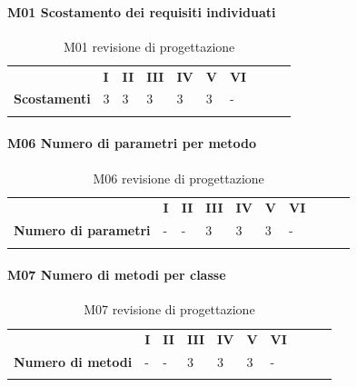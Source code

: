 \paragraph{M01 Scostamento dei requisiti individuati} \mbox{}
\begin{longtable}[H!] {						
		>{}p{50mm}  		
		>{}p{8mm}
		>{}p{8mm}		
		>{}p{8mm}		
		>{}p{8mm}		
		>{}p{8mm}		
		>{}p{8mm}
		>{}p{8mm}
		>{}p{8mm}
		>{}p{8mm}
	}
\rowcolor{gray!50}
\textbf{} & \textbf{I} & \textbf{II} & \textbf{III} & \textbf{IV} & \textbf{V} & \textbf{VI} \TBstrut \\ [2mm]
\textbf{Scostamenti} & 3 & 3 & 3 & 3 & 3 & - \TBstrut \\ [2mm]
	\rowcolor{white}
\caption{M01 revisione di progettazione}
\end{longtable}
\paragraph{M06 Numero di parametri per metodo} \mbox{}
\begin{longtable}[H!] {						
		>{}p{50mm}  		
		>{}p{8mm}
		>{}p{8mm}		
		>{}p{8mm}		
		>{}p{8mm}		
		>{}p{8mm}		
		>{}p{8mm}
		>{}p{8mm}
		>{}p{8mm}
		>{}p{8mm}
	}
	\rowcolor{gray!50}
	\textbf{} & \textbf{I} & \textbf{II} & \textbf{III} & \textbf{IV} & \textbf{V} & \textbf{VI} \TBstrut \\ [2mm]
	\textbf{Numero di parametri} & - & - & 3 & 3 & 3 & - \TBstrut \\ [2mm]
	\rowcolor{white}
	\caption{M06 revisione di progettazione}
\end{longtable}
\paragraph{M07 Numero di metodi per classe} \mbox{}
\begin{longtable}[H!] {						
		>{}p{50mm}  		
		>{}p{8mm}
		>{}p{8mm}		
		>{}p{8mm}		
		>{}p{8mm}		
		>{}p{8mm}		
		>{}p{8mm}
		>{}p{8mm}
		>{}p{8mm}
		>{}p{8mm}
	}
	\rowcolor{gray!50}
	\textbf{} & \textbf{I} & \textbf{II} & \textbf{III} & \textbf{IV} & \textbf{V} & \textbf{VI} \TBstrut \\ [2mm]
	\textbf{Numero di metodi} & - & - & 3 & 3 & 3 & - \TBstrut \\ [2mm]
	\rowcolor{white}
	\caption{M07 revisione di progettazione}
\end{longtable}
